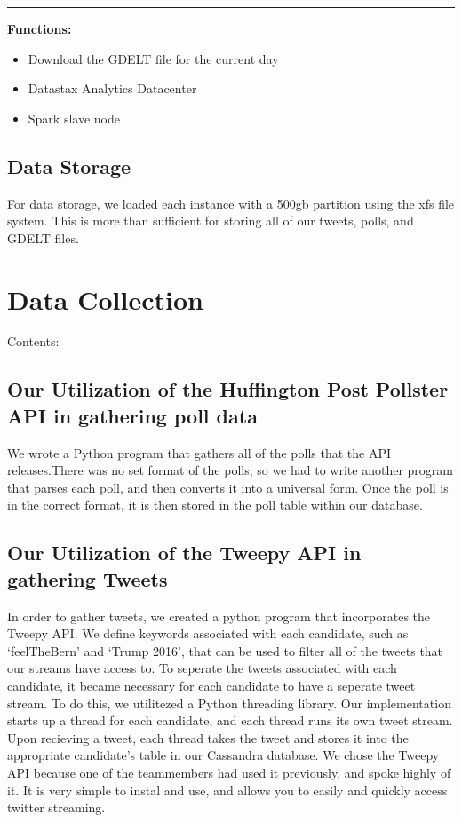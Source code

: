 \documentclass[letterpaper,12pt,english]{sphinxmanual}
\begin{document}
\bigskip\hrule{}\bigskip


\textbf{Functions:}
\begin{itemize}
\item {} 
Download the GDELT file for the current day

\item {} 
Datastax Analytics Datacenter

\item {} 
Spark slave node

\end{itemize}


\subsection{Data Storage}
\label{dataStorage:data-storage}\label{dataStorage::doc}
For data storage, we loaded each instance with a 500gb partition using the xfs file system. This is more than sufficient for storing all of our tweets, polls, and GDELT files.


\section{Data Collection}
\label{dataCollection:data-collection}\label{dataCollection::doc}
Contents:


\subsection{Our Utilization of the Huffington Post Pollster API in gathering poll data}
\label{polls:our-utilization-of-the-huffington-post-pollster-api-in-gathering-poll-data}\label{polls::doc}
We wrote a Python program that gathers all of the polls that the API releases.There was no set format of the polls, so we had to write another program that parses each poll, and then converts it into a universal form. Once the poll is in the correct format, it is then stored in the poll table within our database.


\subsection{Our Utilization of the Tweepy API in gathering Tweets}
\label{twitter::doc}\label{twitter:our-utilization-of-the-tweepy-api-in-gathering-tweets}
In order to gather tweets, we created a python program that incorporates the Tweepy API. We define keywords associated with each candidate, such as `feelTheBern' and `Trump 2016', that can be used to filter all of the tweets that our streams have access to. To seperate the tweets associated with each candidate, it became necessary for each candidate to have a seperate tweet stream. To do this, we utilitezed a Python threading library. Our implementation starts up a thread for each candidate, and each thread runs its own tweet stream. Upon recieving a tweet, each thread takes the tweet and stores it into the appropriate candidate's table in our Cassandra database. We chose the Tweepy API because one of the teammembers had used it previously, and spoke highly of it. It is very simple to instal and use, and allows you to easily and quickly access twitter streaming.
\end{document}
